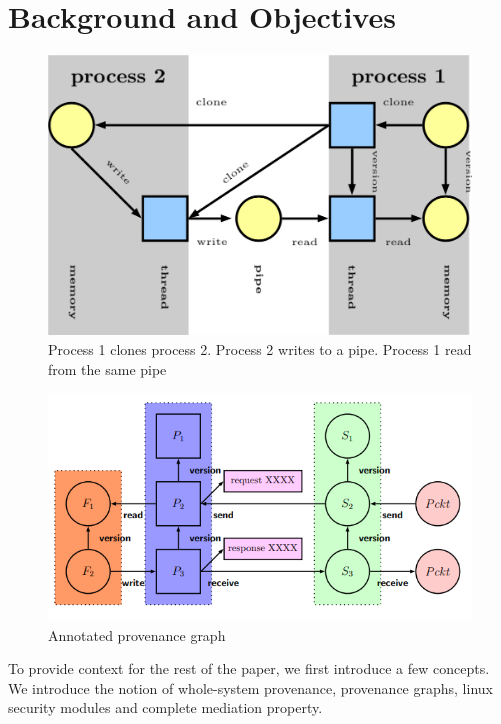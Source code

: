 \section{Background and Objectives}
\begin{figure}
	\centering
	\includegraphics[width=0.7\linewidth]{graph}
	\caption[Provenance graph]{Process 1 clones process 2. Process 2 writes to a pipe. Process 1 read from the same pipe}
	\label{fig:graph}
\end{figure}
\begin{figure}
	\centering
	\includegraphics[width=0.7\linewidth]{Annotated-provenance-graph}
	\caption[Provenance graph]{Annotated provenance graph}
	\label{fig:annotated-provenance-graph}
\end{figure}

To provide context for the rest of the paper, we first introduce a few concepts. We introduce the notion of whole-system provenance, provenance graphs, linux security modules and complete mediation property.

